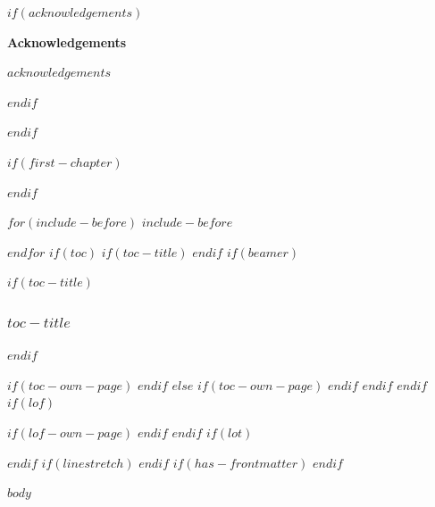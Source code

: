\documentclass{article}
\begin{document}
$if(acknowledgements)$
\begin{center}
 {\LARGE \textbf{\textsf{Acknowledgements}}}
\end{center}

\begin{justify}
$acknowledgements$
\end{justify}
\pagebreak
$endif$

$endif$
\setcounter{page}{0} %

$if(first-chapter)$
\setcounter{chapter}{$first-chapter$}
\addtocounter{chapter}{-1}
$endif$

$for(include-before)$
$include-before$

$endfor$
$if(toc)$
$if(toc-title)$
\renewcommand*\contentsname{$toc-title$}
$endif$
$if(beamer)$
\begin{frame}[allowframebreaks]
$if(toc-title)$
  \frametitle{$toc-title$}
$endif$
  \tableofcontents[hideallsubsections]
\end{frame}
$if(toc-own-page)$
\newpage
$endif$
$else$
{
\setcounter{tocdepth}{$toc-depth$}
\tableofcontents
$if(toc-own-page)$
\newpage
$endif$
}
$endif$
$endif$
$if(lof)$
\listoffigures
$if(lof-own-page)$
\newpage
$endif$
$endif$
$if(lot)$
\listoftables
$endif$
$if(linestretch)$
$endif$
$if(has-frontmatter)$
\mainmatter
$endif$

$body$
\end{document}
